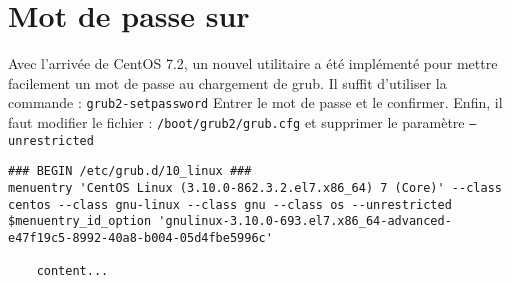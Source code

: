 \section{Mot de passe sur }
Avec l'arrivée de CentOS 7.2, un nouvel utilitaire a été implémenté pour mettre facilement un mot de passe au chargement de grub.
Il suffit d'utiliser la commande : \texttt{grub2-setpassword}
Entrer le mot de passe et le confirmer.
Enfin, il faut modifier le fichier : \texttt{/boot/grub2/grub.cfg} et supprimer le paramètre \texttt{--unrestricted}
\begin{lstlisting}
### BEGIN /etc/grub.d/10_linux ###
menuentry 'CentOS Linux (3.10.0-862.3.2.el7.x86_64) 7 (Core)' --class centos --class gnu-linux --class gnu --class os --unrestricted $menuentry_id_option 'gnulinux-3.10.0-693.el7.x86_64-advanced-e47f19c5-8992-40a8-b004-05d4fbe5996c' 

	content...
\end{lstlisting}

